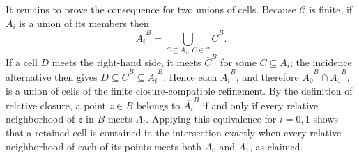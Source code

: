 It remains to prove the consequence for two unions of cells.  Because \(\mathscr C\) is finite, if \(A_i\) is a union of its members then
\[
\overline{A_i}^{B}
=\bigcup_{C\subseteq A_i,\ C\in\mathscr C}\overline C^{B}.
\]
If a cell \(D\) meets the right-hand side, it meets \(\overline C^{B}\) for some \(C\subseteq A_i\); the incidence alternative then gives \(D\subseteq\overline C^{B}\subseteq\overline{A_i}^{B}\).  Hence each \(\overline{A_i}^{B}\), and therefore \(\overline{A_0}^{B}\cap\overline{A_1}^{B}\), is a union of cells of the finite closure-compatible refinement.  By the definition of relative closure, a point \(z\in B\) belongs to \(\overline{A_i}^{B}\) if and only if every relative neighborhood of \(z\) in \(B\) meets \(A_i\).  Applying this equivalence for \(i=0,1\) shows that a retained cell is contained in the intersection exactly when every relative neighborhood of each of its points meets both \(A_0\) and \(A_1\), as claimed.
